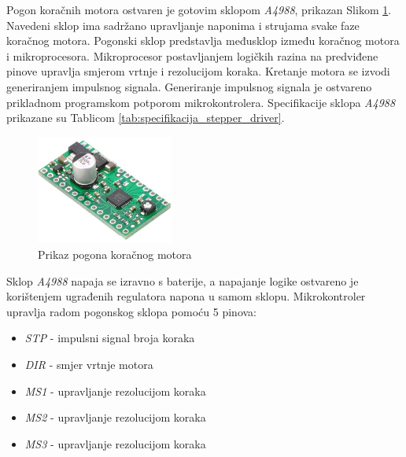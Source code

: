 \documentclass[11pt,a4paper]{article}
\begin{document}
Pogon koračnih motora ostvaren je gotovim sklopom \textit{A4988}, prikazan Slikom \ref{Slika:stepper_driver}. Navedeni sklop ima sadržano upravljanje naponima i strujama svake faze koračnog motora. Pogonski sklop predstavlja međusklop između koračnog motora i mikroprocesora. Mikroprocesor postavljanjem logičkih razina na predviđene pinove upravlja smjerom vrtnje i rezolucijom koraka. Kretanje motora se izvodi generiranjem impulsnog signala. Generiranje impulsnog signala je ostvareno prikladnom programskom potporom mikrokontrolera. Specifikacije sklopa \textit{A4988} prikazane su Tablicom \ref{tab:specifikacija_stepper_driver}.


\begin{figure}[H]
	\centering
	\includegraphics[width=0.4\textwidth]{figures/driver.jpg}
	\caption{Prikaz pogona koračnog motora}
	\label{Slika:stepper_driver}
\end{figure}

Sklop \textit{A4988} napaja se izravno s baterije, a napajanje logike ostvareno je korištenjem ugrađenih regulatora napona u samom sklopu. Mikrokontroler upravlja radom pogonskog sklopa pomoću 5 pinova:
\begin{center}
	\begin{itemize}
		\item \textit{STP} - impulsni signal broja koraka
		\item \textit{DIR} - smjer vrtnje motora
		\item \textit{MS1} - upravljanje rezolucijom koraka
		\item \textit{MS2} - upravljanje rezolucijom koraka
		\item \textit{MS3} - upravljanje rezolucijom koraka
	\end{itemize}
\end{center}
\end{document}
